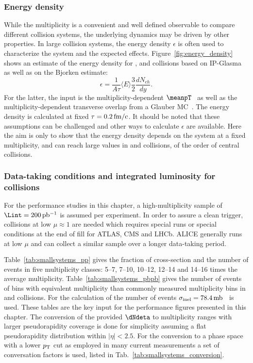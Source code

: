 \documentclass[../report.tex]{subfiles}
\begin{document}
\subsubsection{Energy density}
While the multiplicity is a convenient and well defined observable to compare different collision systems, the underlying dynamics may be driven by other properties. In large collision systems, the energy density $\epsilon$ is often used to characterize the system and the expected effects. Figure~\ref{fig:energy_density} shows an estimate of the energy density for \pp, \pPb and \PbPb collisions based on IP-Glasma~\cite{Bzdak:2013zma} as well as on the Bjorken estimate:
\begin{equation}
  \epsilon = \frac{1}{A \tau} \langle E \rangle \frac{3}{2} \frac{dN_{ch}}{dy}.
\end{equation}
For the latter, the input is the multiplicity-dependent $\meanpT$~\cite{Abelev:2013bla,Acharya:2018njl} as well as the multiplicity-dependent transverse overlap from a Glauber MC~\cite{Loizides:2017ack}. The energy density is calculated at fixed $\tau = \unit[0.2]{fm/c}$. It should be noted that these assumptions can be challenged and other ways to calculate $\epsilon$ are available. Here the aim is only to show that the energy density depends on the system at a fixed multiplicity, and can reach large values in \pp and \pPb collisions, of the order of central \PbPb collisions.

\subsubsection{Data-taking conditions and integrated luminosity for \pp collisions}
For the performance studies in this chapter, a high-multiplicity sample of $\Lint = \unit[200]{pb^{-1}}$ is assumed per experiment. In order to assure a clean trigger, collisions at low $\mu \approx 1$ are needed which requires special runs or special conditions at the end of fill for ATLAS, CMS and LHCb. ALICE generally runs at low $\mu$ and can collect a similar sample over a longer data-taking period.

Table~\ref{tab:smallsystems_pp} gives the fraction of cross-section and the number of events in five multiplicity classes:  5--7, 7--10, 10--12, 12--14 and 14--16 times the average multiplicity. Table~\ref{tab:smallsystems_pbpb} gives the number of events of bins with equivalent multiplicity than commonly measured multiplicity bins in \pPb and \PbPb collisions. For the calculation of the number of events $\sigma_{\rm inel} = \unit[78.4]{mb}$~\cite{Loizides:2017ack} is used. These tables are the key input for the performance figures presented in this chapter. 
The conversion of the provided $\dNdeta$ to multiplicity ranges with larger pseudorapidity coverage is done for simplicity assuming a flat pseudorapidity distribution within $|\eta| < 2.5$. For the conversion to a phase space with a lower $p\sb{\scriptstyle\mathrm{T}}$ cut as employed in many current measurements a set of conversation factors is used, listed in Tab.~\ref{tab:smallsystems_conversion}.
\end{document}
